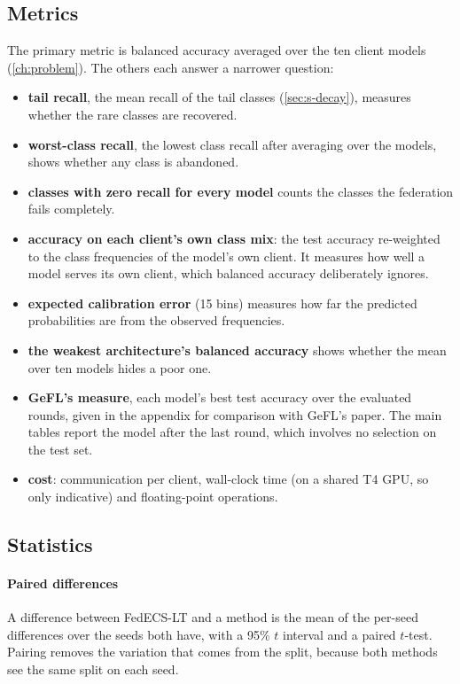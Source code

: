 \subsection{Metrics}

The primary metric is balanced accuracy averaged over the ten client models (\cref{ch:problem}). The others each answer
a narrower question:
\begin{itemize}
\item \textbf{tail recall}, the mean recall of the tail classes (\cref{sec:s-decay}), measures whether the rare
classes are recovered.
\item \textbf{worst-class recall}, the lowest class recall after averaging over the models, shows whether any class is
abandoned.
\item \textbf{classes with zero recall for every model} counts the classes the federation fails completely.
\item \textbf{accuracy on each client's own class mix}: the test accuracy re-weighted to the class frequencies of the
model's own client. It measures how well a model serves its own client, which balanced accuracy deliberately ignores.
\item \textbf{expected calibration error} (15 bins) measures how far the predicted probabilities are from the observed
frequencies.
\item \textbf{the weakest architecture's balanced accuracy} shows whether the mean over ten models hides a poor one.
\item \textbf{GeFL's measure}, each model's best test accuracy over the evaluated rounds, given in the appendix for
comparison with GeFL's paper. The main tables report the model after the last round, which involves no selection on
the test set.
\item \textbf{cost}: communication per client, wall-clock time (on a shared T4 GPU, so only indicative) and
floating-point operations.
\end{itemize}

\subsection{Statistics}\label{sec:s-stats-design}

\paragraph{Paired differences} A difference between FedECS-LT and a method is the mean of the per-seed differences
over the seeds both have, with a 95\% $t$ interval and a paired $t$-test. Pairing removes the variation that comes from
the split, because both methods see the same split on each seed.

